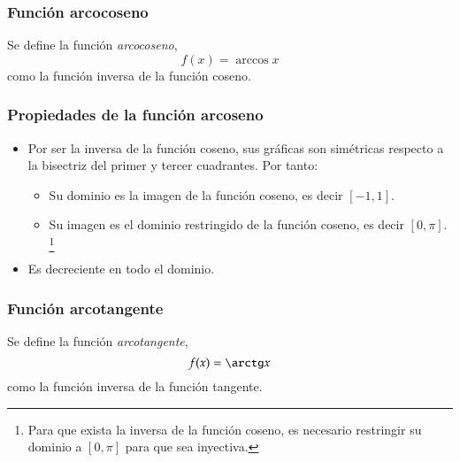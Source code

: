 		
		\begin{frame}
			\frametitle{Función arcocoseno}
			\begin{definicion}
				Se define la función \emph{arcocoseno},
				\[f(x)=\arccos x\]
				como la función inversa de la función coseno.
			\end{definicion}
			\begin{center}
				\scalebox{1}{}
			\end{center}
		\end{frame} 
		
		
		\begin{frame}
			\frametitle{Propiedades de la función arcoseno}
			\begin{itemize}
				\item Por ser la inversa de la función coseno, sus gráficas son simétricas respecto a la bisectriz del primer y tercer
				      cuadrantes. Por tanto:
				      \begin{itemize}
				      	\item Su dominio es la imagen de la función coseno, es decir $[-1,1]$.
				      	\item Su imagen es el dominio restringido de la función coseno, es decir $[0,\pi]$.
				      	      \footnote{Para que exista la inversa de la función coseno, es necesario restringir su dominio a $[0,\pi]$ para que sea inyectiva.}
				      \end{itemize}
				\item Es decreciente en todo el dominio.
			\end{itemize}
		\end{frame} 
		
		
		\begin{frame}
			\frametitle{Función arcotangente}
			\begin{definicion}
				Se define la función \emph{arcotangente},
				\[f(x)=\arctg x\]
				como la función inversa de la función tangente.
			\end{definicion}
			\begin{center}
				\scalebox{1}{}
			\end{center}
		\end{frame} 
		
